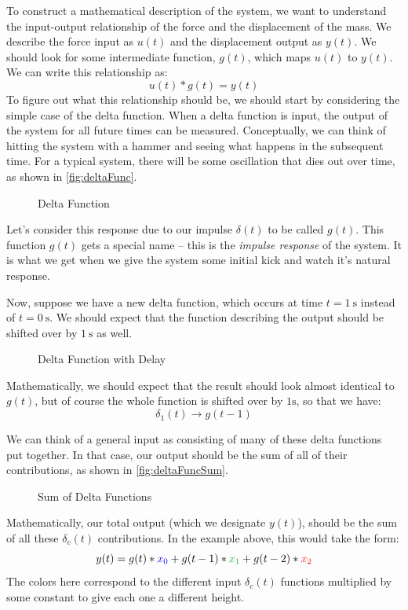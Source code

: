 To construct a mathematical description of the system, we want to understand the input-output relationship of the force and the displacement of the mass. We describe the force input as $u(t)$ and the displacement output as $y(t)$. We should look for some intermediate function, $g(t)$, which maps $u(t)$ to $y(t)$. We can write this relationship as:
$$u(t)*g(t)=y(t)$$
To figure out what this relationship should be, we should start by considering the simple case of the delta function. When a delta function is input, the output of the system for all future times can be measured. Conceptually, we can think of hitting the system with a hammer and seeing what happens in the subsequent time. For a typical system, there will be some oscillation that dies out over time, as shown in \autoref{fig:deltaFunc}.
\begin{figure}[ht]
    \centering
     
    \caption{Delta Function}
    \label{fig:deltaFunc}
\end{figure}
Let's consider this response due to our impulse $\delta(t)$ to be called $g(t)$. This function $g(t)$ gets a special name -- this is the \textit{impulse response} of the system. It is what we get when we give the system some initial kick and watch it's natural response.

Now, suppose we have a new delta function, which occurs at time $t=1 \ \mathrm{s}$ instead of $t=0 \ \mathrm{s}$. We should expect that the function describing the output should be shifted over by $1 \ \mathrm{s}$ as well.
\begin{figure}[ht]
    \centering
    
    \caption{Delta Function with Delay}
    \label{fig:deltaFuncDelay}
\end{figure}
Mathematically, we should expect that the result should look almost identical to $g(t)$, but of course the whole function is shifted over by $1 \text{s}$, so that we have:
$$\delta_1(t)\rightarrow g(t-1)$$

We can think of a general input as consisting of many of these delta functions put together. In that case, our output should be the sum of all of their contributions, as shown in \autoref{fig:deltaFuncSum}.
\begin{figure}[ht]
    \centering
    
    \caption{Sum of Delta Functions}
    \label{fig:deltaFuncSum}
\end{figure}
Mathematically, our total output (which we designate $y(t)$), should be the sum of all these $\delta_c(t)$ contributions. In the example above, this would take the form:
$$y(t)=g(t)*\color{blue}x_0\color{black}+g(t-1)*\color{linkgreen}x_1\color{black}+g(t-2)*\color{red}x_2\color{black}$$
The colors here correspond to the different input $\delta_c(t)$ functions multiplied by some constant to give each one a different height. 

